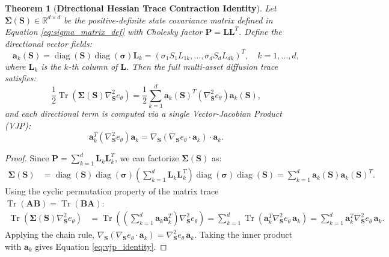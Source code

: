 \documentclass[11pt,a4paper]{article}
\newtheorem{theorem}{Theorem}
\begin{document}
\begin{theorem}[\textbf{Directional Hessian Trace Contraction Identity}]
\label{thm:directional_trace}
Let $\boldsymbol{\Sigma}(\mathbf{S}) \in \mathbb{R}^{d \times d}$ be the positive-definite state covariance matrix defined in Equation \eqref{eq:sigma_matrix_def} with Cholesky factor $\mathbf{P} = \mathbf{L}\mathbf{L}^T$. Define the directional vector fields:
\begin{equation}
\label{eq:directional_vectors}
\mathbf{a}_k(\mathbf{S}) = \operatorname{diag}(\mathbf{S}) \operatorname{diag}(\boldsymbol{\sigma}) \mathbf{L}_k = \left( \sigma_1 S_1 L_{1k}, \dots, \sigma_d S_d L_{dk} \right)^T, \quad k = 1, \dots, d,
\end{equation}
where $\mathbf{L}_k$ is the $k$-th column of $\mathbf{L}$. Then the full multi-asset diffusion trace satisfies:
\begin{equation}
\label{eq:trace_identity}
\frac{1}{2} \operatorname{Tr}\left( \boldsymbol{\Sigma}(\mathbf{S}) \nabla^2_{\mathbf{S}} e_\theta \right) = \frac{1}{2} \sum_{k=1}^d \mathbf{a}_k(\mathbf{S})^T \left( \nabla^2_{\mathbf{S}} e_\theta \right) \mathbf{a}_k(\mathbf{S}),
\end{equation}
and each directional term is computed via a single Vector-Jacobian Product (VJP):
\begin{equation}
\label{eq:vjp_identity}
\mathbf{a}_k^T \left( \nabla^2_{\mathbf{S}} e_\theta \right) \mathbf{a}_k = \nabla_{\mathbf{S}} \left( \nabla_{\mathbf{S}} e_\theta \cdot \mathbf{a}_k \right) \cdot \mathbf{a}_k.
\end{equation}
\end{theorem}

\begin{proof}
Since $\mathbf{P} = \sum_{k=1}^d \mathbf{L}_k \mathbf{L}_k^T$, we can factorize $\boldsymbol{\Sigma}(\mathbf{S})$ as:
\begin{align}
\boldsymbol{\Sigma}(\mathbf{S}) &= \operatorname{diag}(\mathbf{S})\operatorname{diag}(\boldsymbol{\sigma}) \left( \sum_{k=1}^d \mathbf{L}_k \mathbf{L}_k^T \right) \operatorname{diag}(\boldsymbol{\sigma})\operatorname{diag}(\mathbf{S}) = \sum_{k=1}^d \mathbf{a}_k(\mathbf{S}) \mathbf{a}_k(\mathbf{S})^T.
\end{align}
Using the cyclic permutation property of the matrix trace $\operatorname{Tr}(\mathbf{A}\mathbf{B}) = \operatorname{Tr}(\mathbf{B}\mathbf{A})$:
\begin{align}
\operatorname{Tr}\left( \boldsymbol{\Sigma}(\mathbf{S}) \nabla^2_{\mathbf{S}} e_\theta \right) &= \operatorname{Tr}\left( \left( \sum_{k=1}^d \mathbf{a}_k \mathbf{a}_k^T \right) \nabla^2_{\mathbf{S}} e_\theta \right) = \sum_{k=1}^d \operatorname{Tr}\left( \mathbf{a}_k^T \nabla^2_{\mathbf{S}} e_\theta \, \mathbf{a}_k \right) = \sum_{k=1}^d \mathbf{a}_k^T \nabla^2_{\mathbf{S}} e_\theta \, \mathbf{a}_k.
\end{align}
Applying the chain rule, $\nabla_{\mathbf{S}}(\nabla_{\mathbf{S}} e_\theta \cdot \mathbf{a}_k) = \nabla^2_{\mathbf{S}} e_\theta \, \mathbf{a}_k$. Taking the inner product with $\mathbf{a}_k$ gives Equation \eqref{eq:vjp_identity}.
\end{proof}
\end{document}
